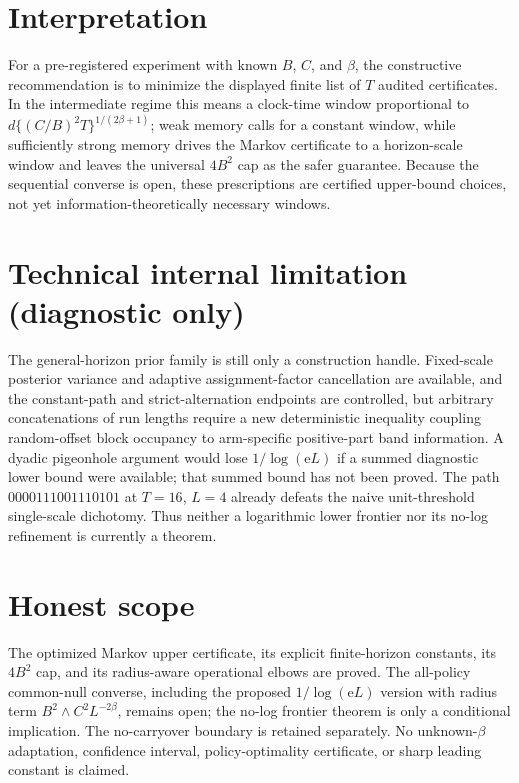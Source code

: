 \documentclass{article}
\begin{document}
\section{Interpretation}

For a pre-registered experiment with known \(B\), \(C\), and \(\beta\), the constructive recommendation is to minimize the displayed finite list of \(T\) audited certificates.  In the intermediate regime this means a clock-time window proportional to \(d\{(C/B)^2T\}^{1/(2\beta+1)}\); weak memory calls for a constant window, while sufficiently strong memory drives the Markov certificate to a horizon-scale window and leaves the universal \(4B^2\) cap as the safer guarantee.  Because the sequential converse is open, these prescriptions are certified upper-bound choices, not yet information-theoretically necessary windows.

\section*{Technical internal limitation (diagnostic only)}

The general-horizon prior family is still only a construction handle.  Fixed-scale posterior variance and adaptive assignment-factor cancellation are available, and the constant-path and strict-alternation endpoints are controlled, but arbitrary concatenations of run lengths require a new deterministic inequality coupling random-offset block occupancy to arm-specific positive-part band information.  A dyadic pigeonhole argument would lose \(1/\log(\mathrm eL)\) if a summed diagnostic lower bound were available; that summed bound has not been proved.  The path \(0000111001110101\) at \(T=16\), \(L=4\) already defeats the naive unit-threshold single-scale dichotomy.  Thus neither a logarithmic lower frontier nor its no-log refinement is currently a theorem.

\section{Honest scope}

The optimized Markov upper certificate, its explicit finite-horizon constants, its \(4B^2\) cap, and its radius-aware operational elbows are proved.  The all-policy common-null converse, including the proposed \(1/\log(\mathrm eL)\) version with radius term \(B^2\wedge C^2L^{-2\beta}\), remains open; the no-log frontier theorem is only a conditional implication.  The no-carryover boundary is retained separately.  No unknown-\(\beta\) adaptation, confidence interval, policy-optimality certificate, or sharp leading constant is claimed.
\end{document}
